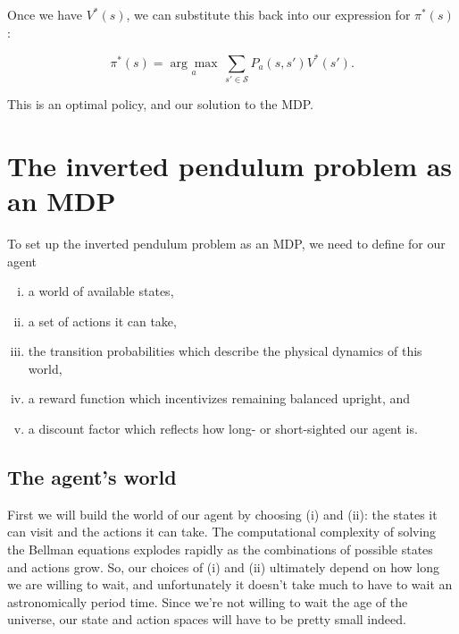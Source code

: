 \documentclass[12pt]{article}
\begin{document}

Once we have $V^*(s)$, we can substitute this back into our expression for $\pi^*(s)$:

\begin{equation}
\pi^*(s) = \underset{a}{\arg\max} \, \sum_{s' \in \mathscr{S}} P_a(s, s') V^*(s').
\end{equation}

This is an optimal policy, and our solution to the MDP.

\section{The inverted pendulum problem as an MDP}

To set up the inverted pendulum problem as an MDP, we need to define for our agent

\begin{enumerate}[(i)]
\item{a world of available states,}
\item{a set of actions it can take,}
\item{the transition probabilities which describe the physical dynamics of this world,}
\item{a reward function which incentivizes remaining balanced upright, and}
\item{a discount factor which reflects how long- or short-sighted our agent is.}
\end{enumerate}

\subsection{The agent's world}

First we will build the world of our agent by choosing (i) and (ii): the states it can visit and the actions it can take. The computational complexity of solving the Bellman equations explodes rapidly as the combinations of possible states and actions grow. So, our choices of (i) and (ii) ultimately depend on how long we are willing to wait, and unfortunately it doesn't take much to have to wait an astronomically period time. Since we're not willing to wait the age of the universe, our state and action spaces will have to be pretty small indeed.
\end{document}
